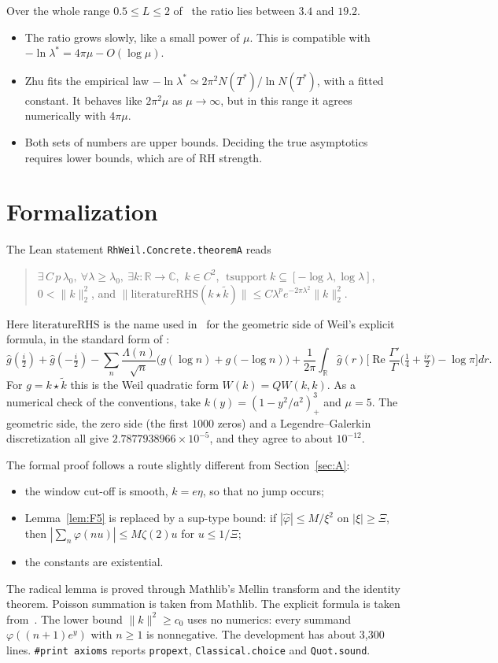 \documentclass[11pt]{amsart}
\theoremstyle{definition}
\theoremstyle{remark}
\numberwithin{equation}{section}
\newcommand{\R}{\mathbb{R}}
\newcommand{\C}{\mathbb{C}}
\newcommand{\lean}[1]{\nolinkurl{#1}}
\begin{document}
Over the whole range $0.5\le L\le2$ of~\cite[Table~3]{Zhu26} the ratio lies between $3.4$ and $19.2$.
\begin{itemize}
\item The ratio grows slowly, like a small power of $\mu$. This is compatible with $-\ln\lambda^*=4\pi\mu-O(\log\mu)$.
\item Zhu fits the empirical law $-\ln\lambda^*\simeq2\pi^2N(T^*)/\ln N(T^*)$, with a fitted constant. It behaves like $2\pi^2\mu$ as $\mu\to\infty$, but in this range it agrees numerically with $4\pi\mu$.
\item Both sets of numbers are upper bounds. Deciding the true asymptotics requires lower bounds, which are of RH strength.
\end{itemize}

\section{Formalization}\label{sec:lean}

The Lean statement \lean{RhWeil.Concrete.theoremA} reads
\begin{quote}\small
$\exists\,C\,p\,\lambda_0,\ \forall\lambda\ge\lambda_0,\ \exists k:\R\to\C,$ $k\in C^2$, $\operatorname{tsupport}k\subseteq[-\log\lambda,\log\lambda]$, $0<\|k\|_2^2$, and $\big\|\mathrm{literatureRHS}(k\star\tilde k)\big\|\le C\lambda^pe^{-2\pi\lambda^2}\|k\|_2^2$.
\end{quote}
Here $\mathrm{literatureRHS}$ is the name used in~\cite{Zeta23} for the geometric side of Weil's explicit formula, in the standard form of \cite[Thm.~5.12]{IK04}:
\[
\hat g(\tfrac i2)+\hat g(-\tfrac i2)-\sum_{n}\frac{\Lambda(n)}{\sqrt n}\big(g(\log n)+g(-\log n)\big)+\frac1{2\pi}\int_\R\hat g(r)\Big[\operatorname{Re}\frac{\Gamma'}{\Gamma}\big(\tfrac14+\tfrac{ir}2\big)-\log\pi\Big]dr .
\]
For $g=k\star\tilde k$ this is the Weil quadratic form $W(k)=QW(k,k)$. As a numerical check of the conventions, take $k(y)=(1-y^2/a^2)^3_+$ and $\mu=5$. The geometric side, the zero side (the first $1000$ zeros) and a Legendre--Galerkin discretization all give $2.7877938966\times10^{-5}$, and they agree to about $10^{-12}$.

The formal proof follows a route slightly different from Section~\ref{sec:A}:
\begin{itemize}
\item the window cut-off is smooth, $k=e\eta$, so that no jump occurs;
\item Lemma~\ref{lem:F5} is replaced by a sup-type bound: if $|\hat\varphi|\le M/\xi^2$ on $|\xi|\ge\Xi$, then $|\sum_n\varphi(nu)|\le M\zeta(2)u$ for $u\le1/\Xi$;
\item the constants are existential.
\end{itemize}
The radical lemma is proved through Mathlib's Mellin transform and the identity theorem. Poisson summation is taken from Mathlib. The explicit formula is taken from~\cite{Zeta23}. The lower bound $\|k\|^2\ge c_0$ uses no numerics: every summand $\varphi((n+1)e^y)$ with $n\ge1$ is nonnegative. The development has about 3{,}300 lines. \lean{\#print axioms} reports \lean{propext}, \lean{Classical.choice} and \lean{Quot.sound}.
\end{document}
